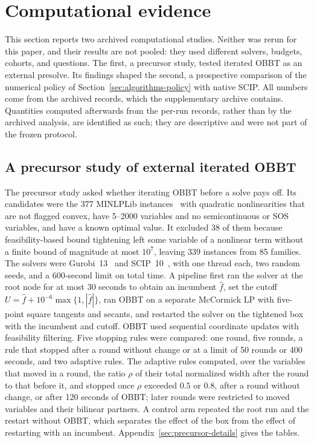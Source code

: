 \section{Computational evidence}\label{sec:experiments}

This section reports two archived computational studies. Neither was rerun
for this paper, and their results are not pooled: they used different
solvers, budgets, cohorts, and questions. The first, a precursor study,
tested iterated OBBT as an external presolve. Its findings shaped the second,
a prospective comparison of the numerical policy of
Section~\ref{sec:algorithms-policy} with native SCIP. All numbers come from
the archived records, which the supplementary archive contains. Quantities
computed afterwards from the per-run records, rather than by the archived
analysis, are identified as such; they are descriptive and were not part of the
frozen protocol.

\subsection{A precursor study of external iterated OBBT}\label{sec:experiments-precursor}

The precursor study asked whether iterating OBBT before a solve pays off.
Its candidates were the 377 MINLPLib instances~\cite{bussieck2003-minlpliba-collection-of-test-models,vigerske2026-minlplib-a-library-of-mixed} with quadratic nonlinearities
that are not flagged convex, have 5--2000 variables and no semicontinuous or SOS
variables, and have a known optimal value. It excluded 38 of them because
feasibility-based bound tightening left some variable of a nonlinear term
without a finite bound of magnitude at most $10^7$, leaving 339 instances from
85 families. The
solvers were Gurobi~13~\cite{gurobi2026-reference-manual} and
SCIP~10~\cite{hojny2025-the-scip-optimization-suite-10}, with one thread each,
two random seeds, and a
600-second limit on total time. A pipeline first ran the solver at the root node
for at most 30 seconds to obtain an incumbent $\hat f$, set the cutoff
$U=\hat f+10^{-6}\max\{1,|\hat f|\}$, ran OBBT on a separate McCormick LP with
five-point square tangents and secants, and restarted the solver on the
tightened box with the incumbent and cutoff. OBBT used sequential coordinate
updates with feasibility filtering. Five stopping rules were compared: one
round, five rounds, a rule that stopped after a round without change or at a
limit of 50 rounds or 400 seconds, and two adaptive rules. The adaptive rules
computed, over the variables that moved in a round, the ratio $\rho$ of their
total normalized width after the round to that before it, and stopped once
$\rho$ exceeded $0.5$ or $0.8$, after a round without change, or after 120
seconds of OBBT; later rounds were restricted to moved variables and their
bilinear partners. A control arm repeated the root run and the restart without OBBT,
which separates the effect of the box from the effect of restarting with an
incumbent. Appendix~\ref{sec:precursor-details} gives the tables.

